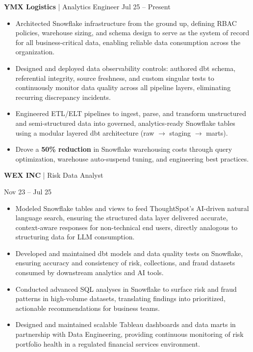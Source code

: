 \documentclass[9pt, letterpaper]{article}
\begin{document}
	\noindent \textbf{YMX Logistics} | Analytics Engineer \hfill Jul 25 -- Present
	\begin{itemize}[noitemsep, topsep=0pt, leftmargin=1.5em, rightmargin=0.5cm]
		\item Architected Snowflake infrastructure from the ground up, defining RBAC policies, warehouse sizing, and schema design to serve as the system of record for all business-critical data, enabling reliable data consumption across the organization.
		\item Designed and deployed data observability controls: authored dbt schema, referential integrity, source freshness, and custom singular tests to continuously monitor data quality across all pipeline layers, eliminating recurring discrepancy incidents.
		\item Engineered ETL/ELT pipelines to ingest, parse, and transform unstructured and semi-structured data into governed, analytics-ready Snowflake tables using a modular layered dbt architecture (raw $\rightarrow$ staging $\rightarrow$ marts).
		\item Drove a \textbf{50\% reduction} in Snowflake warehousing costs through query optimization, warehouse auto-suspend tuning, and engineering best practices.
	\end{itemize}

	\noindent \begin{minipage}[t]{0.75\textwidth}
		\textbf{WEX INC} | Risk Data Analyst
	\end{minipage}
	\begin{minipage}[t]{0.25\textwidth}
		\raggedleft Nov 23 -- Jul 25
	\end{minipage}

	\begin{itemize}[noitemsep, topsep=0pt, leftmargin=1.5em, rightmargin=0.5cm]
		\item Modeled Snowflake tables and views to feed ThoughtSpot's AI-driven natural language search, ensuring the structured data layer delivered accurate, context-aware responses for non-technical end users, directly analogous to structuring data for LLM consumption.
		\item Developed and maintained dbt models and data quality tests on Snowflake, ensuring accuracy and consistency of risk, collections, and fraud datasets consumed by downstream analytics and AI tools.
		\item Conducted advanced SQL analyses in Snowflake to surface risk and fraud patterns in high-volume datasets, translating findings into prioritized, actionable recommendations for business teams.
		\item Designed and maintained scalable Tableau dashboards and data marts in partnership with Data Engineering, providing continuous monitoring of risk portfolio health in a regulated financial services environment.
	\end{itemize}
\end{document}
